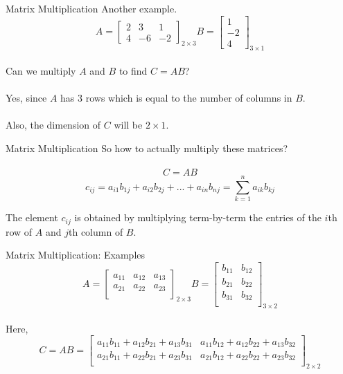 \documentclass{./../../Latex/teaching_slides}
\begin{document}
\begin{frame}{Matrix Multiplication}
Another example.
$$A = \begin{bmatrix}
2 & 3 & 1 \\
4 & -6 & -2
\end{bmatrix}_{2 \times 3}
B = \begin{bmatrix}
1 \\
-2 \\
4
\end{bmatrix}_{3 \times 1}$$ \\
Can we multiply $A$ and $B$ to find $C=AB$? \\~\\
\pause Yes, since $A$ has 3 rows which is equal to the number of columns in $B$. \\~\\
Also, the dimension of $C$ will be $2 \times 1$.
\end{frame}



\begin{frame}{Matrix Multiplication}
So how to actually multiply these matrices? \\~\\
$$ C = AB$$
$$ c_{ij} = a_{i1} b_{1j} + a_{i2} b_{2j} + ... + a_{in} b_{nj} = \sum_{k=1}^n a_{ik} b_{kj}   $$

\vspace{1em}
The \alert{element $c_{ij}$} is obtained by multiplying term-by-term the entries of the \alert{$i$th row of $A$} and \alert{$j$th column of $B$}. 
\end{frame}


\begin{frame}{Matrix Multiplication: Examples}
$$A = \begin{bmatrix}
a_{11} & a_{12} &  a_{13} \\
a_{21} & a_{22} &  a_{23} \\
\end{bmatrix}_{2 \times 3}
B = \begin{bmatrix}
b_{11} & b_{12} \\
b_{21} & b_{22} \\
b_{31} & b_{32} \\
\end{bmatrix}_{3 \times 2}$$ \\
Here, \small
$$C = AB = \begin{bmatrix}
 a_{11}b_{11} +  a_{12}b_{21} + a_{13}b_{31} &  a_{11}b_{12} +  a_{12}b_{22} + a_{13}b_{32} \\
  a_{21}b_{11} +  a_{22}b_{21} + a_{23}b_{31} &  a_{21}b_{12} +  a_{22}b_{22} + a_{23}b_{32} \\
\end{bmatrix}_{2 \times 2} $$
\end{frame}
\end{document}
